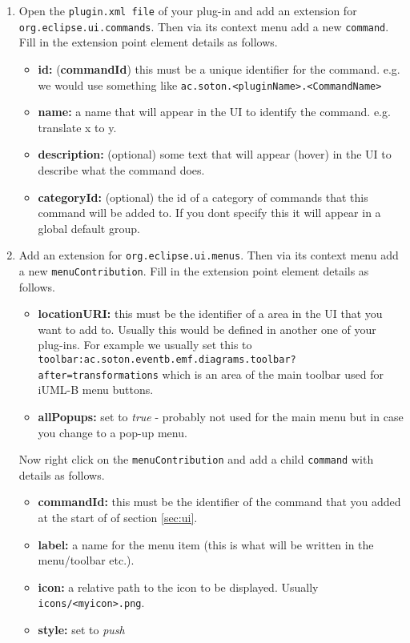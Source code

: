 \begin{enumerate}
	\item
	Open the \texttt{plugin.xml file} of your plug-in and add an extension for \texttt{org.eclipse.ui.commands}. Then via its context menu add a new \texttt{command}. Fill in the extension point element details as follows.
	\begin{itemize}
		\item \textbf{id:} (\textbf{commandId}) this must be a unique identifier for the command. e.g. we would use something like \texttt{ac.soton.<pluginName>.<CommandName>}
		\item \textbf{name:} a name that will appear in the UI to identify the command. e.g. translate x to y.
		\item \textbf{description:} (optional) some text that will appear (hover) in the UI to describe what the command does.
		\item \textbf{categoryId:} (optional) the id of a category of commands that this command will be added to. If you dont specify this it will appear in a global default group.
	\end{itemize}
	
	\item
	Add an extension for \texttt{org.eclipse.ui.menus}. Then via its context menu add a new \texttt{menuContribution}. Fill in the extension point element details as follows.
	\begin{itemize}
		\item \textbf{locationURI:} this must be the identifier of a area in the UI that you want to add to. Usually this would be defined in another one of your plug-ins. For example we usually set this to \\
		\texttt{toolbar:ac.soton.eventb.emf.diagrams.toolbar?after=transformations}
		which is an area of the main toolbar used for iUML-B menu buttons.
		\item \textbf{allPopups:} set to \emph{true} - probably not used for the main menu but in case you change to a pop-up menu.
	\end{itemize}
	Now right click on the \texttt{menuContribution} and add a child \texttt{command} with details as follows.
	\begin{itemize}
		\item \textbf{commandId:} this must be the identifier of the command that you added at the start of of section \ref{sec:ui}.
		\item \textbf{label:} a name for the menu item (this is what will be written in the menu/toolbar etc.).
		\item \textbf{icon:} a relative path to the icon to be displayed. Usually \texttt{icons/<myicon>.png}. 
		\item \textbf{style:} set to \emph{push}
	\end{itemize}
		

\end{enumerate}
